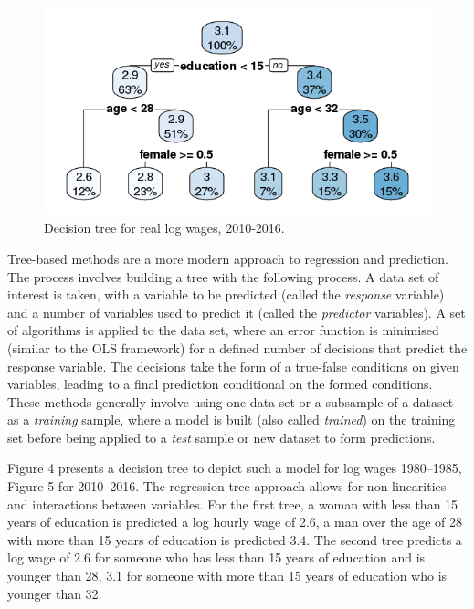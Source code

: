 \documentclass[notitlepage,12pt]{article}
\begin{document}
\begin{figure}
  \centering
  \caption{Decision tree for real log wages, 2010-2016.}
  \includegraphics[width=\textwidth]{Rpat2010_2016.png}
\end{figure}

Tree-based methods are a more modern approach to regression and prediction.  The process involves building a tree with the following process.  A data set of interest is taken, with a variable to be predicted (called the \textit{response} variable) and a number of variables used to predict it (called the \textit{predictor} variables).  A set of algorithms is applied to the data set, where an error function is minimised (similar to the OLS framework) for a defined number of decisions that predict the response variable.  The decisions take the form of a true-false conditions on given variables, leading to a final prediction conditional on the formed conditions.  These methods generally involve using one data set or a subsample of a dataset as a \textit{training} sample, where a model is built (also called \textit{trained}) on the training set before being applied to a \textit{test} sample or new dataset to form predictions.

Figure 4 presents a decision tree to depict such a model for log wages 1980--1985, Figure 5 for 2010--2016.  The regression tree approach allows for non-linearities and interactions between variables.  For the first tree, a woman with less than 15 years of education is predicted a log hourly wage of 2.6, a man over the age of 28 with more than 15 years of education is predicted 3.4.  The second tree predicts a log wage of 2.6 for someone who has less than 15 years of education and is younger than 28, 3.1 for someone with more than 15 years of education who is younger than 32.
\end{document}
